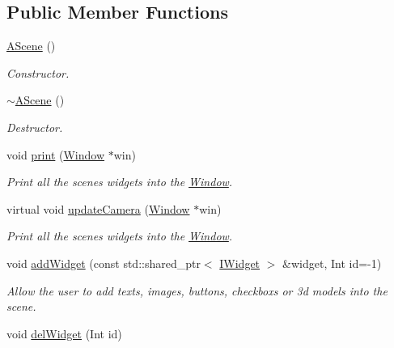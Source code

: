 \subsection*{Public Member Functions}
\begin{DoxyCompactItemize}
\item 
\mbox{\label{classAScene_ad0eacf691dbc8240fdf3a42d450c1042}} 
\hyperlink{classAScene_ad0eacf691dbc8240fdf3a42d450c1042}{A\+Scene} ()
\begin{DoxyCompactList}\small\item\em Constructor. \end{DoxyCompactList}\item 
\mbox{\label{classAScene_a9faf7f1a271327227e83627432d0b210}} 
\hyperlink{classAScene_a9faf7f1a271327227e83627432d0b210}{$\sim$\+A\+Scene} ()
\begin{DoxyCompactList}\small\item\em Destructor. \end{DoxyCompactList}\item 
void \hyperlink{classAScene_ae5d7463a823ed64f3846b5847340b68c}{print} (\hyperlink{classWindow}{Window} $\ast$win)
\begin{DoxyCompactList}\small\item\em Print all the scene\textquotesingle{}s widgets into the \hyperlink{classWindow}{Window}. \end{DoxyCompactList}\item 
virtual void \hyperlink{classAScene_a18070899d965f1811c2253ad1d939374}{update\+Camera} (\hyperlink{classWindow}{Window} $\ast$win)
\begin{DoxyCompactList}\small\item\em Print all the scene\textquotesingle{}s widgets into the \hyperlink{classWindow}{Window}. \end{DoxyCompactList}\item 
void \hyperlink{classAScene_aa711b6068dd8dee262160eedfd96ad02}{add\+Widget} (const std\+::shared\+\_\+ptr$<$ \hyperlink{classIWidget}{I\+Widget} $>$ \&widget, Int id=-\/1)
\begin{DoxyCompactList}\small\item\em Allow the user to add texts, images, buttons, checkboxs or 3d models into the scene. \end{DoxyCompactList}\item 
void \hyperlink{classAScene_ad2b0ac8cd74a8523c76b681a34b5f5b4}{del\+Widget} (Int id)

\end{DoxyCompactItemize}
